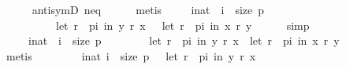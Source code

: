 \begin{isabellebody}
\ \ \ \ \isamarkupfalse%
\ antisymD\ neq\isanewline
\ \ \ \ \isamarkupfalse%
\ metis\isanewline
\ \ \isamarkupfalse%
\ {\isachardoublequoteopen}{\isasymforall}\ i{\isacharcolon}{\kern0pt}{\isacharcolon}{\kern0pt}nat\ {\isachardot}{\kern0pt}\ i\ {\isacharless}{\kern0pt}\ size\ p\ {\isasymlongrightarrow}\isanewline
\ \ \ \ \ \ \ \ \ \ {\isacharparenleft}{\kern0pt}{\isacharparenleft}{\kern0pt}let\ r\ {\isacharequal}{\kern0pt}\ {\isacharparenleft}{\kern0pt}p{\isacharbang}{\kern0pt}i{\isacharparenright}{\kern0pt}\ in\ {\isacharparenleft}{\kern0pt}y\ {\isasympreceq}\isactrlsub r\ x{\isacharparenright}{\kern0pt}{\isacharparenright}{\kern0pt}\ {\isasymlongrightarrow}\ {\isasymnot}\ {\isacharparenleft}{\kern0pt}let\ r\ {\isacharequal}{\kern0pt}\ {\isacharparenleft}{\kern0pt}p{\isacharbang}{\kern0pt}i{\isacharparenright}{\kern0pt}\ in\ {\isacharparenleft}{\kern0pt}x\ {\isasympreceq}\isactrlsub r\ y{\isacharparenright}{\kern0pt}{\isacharparenright}{\kern0pt}{\isacharparenright}{\kern0pt}{\isachardoublequoteclose}\isanewline
\ \ \ \ \isamarkupfalse%
\ simp\isanewline
\ \ \isamarkupfalse%
\ {}\ \isamarkupfalse%
\isanewline
\ \ \ \ {\isachardoublequoteopen}{\isasymforall}\ i{\isacharcolon}{\kern0pt}{\isacharcolon}{\kern0pt}nat\ {\isachardot}{\kern0pt}\ i\ {\isacharless}{\kern0pt}\ size\ p\ {\isasymlongrightarrow}\isanewline
\ \ \ \ \ \ {\isasymnot}\ {\isacharparenleft}{\kern0pt}let\ r\ {\isacharequal}{\kern0pt}\ {\isacharparenleft}{\kern0pt}p{\isacharbang}{\kern0pt}i{\isacharparenright}{\kern0pt}\ in\ {\isacharparenleft}{\kern0pt}y\ {\isasympreceq}\isactrlsub r\ x{\isacharparenright}{\kern0pt}{\isacharparenright}{\kern0pt}\ {\isacharequal}{\kern0pt}\ {\isacharparenleft}{\kern0pt}let\ r\ {\isacharequal}{\kern0pt}\ {\isacharparenleft}{\kern0pt}p{\isacharbang}{\kern0pt}i{\isacharparenright}{\kern0pt}\ in\ {\isacharparenleft}{\kern0pt}x\ {\isasympreceq}\isactrlsub r\ y{\isacharparenright}{\kern0pt}{\isacharparenright}{\kern0pt}{\isachardoublequoteclose}\isanewline
\ \ \ \ \isamarkupfalse%
\ metis\isanewline
\ \ \isamarkupfalse%
\ {}{\isacharcolon}{\kern0pt}\isanewline
\ \ \ \ {\isachardoublequoteopen}{\isacharbraceleft}{\kern0pt}i{\isacharcolon}{\kern0pt}{\isacharcolon}{\kern0pt}nat{\isachardot}{\kern0pt}\ i\ {\isacharless}{\kern0pt}\ size\ p\ {\isasymand}\ {\isasymnot}\ {\isacharparenleft}{\kern0pt}let\ r\ {\isacharequal}{\kern0pt}\ {\isacharparenleft}{\kern0pt}p{\isacharbang}{\kern0pt}i{\isacharparenright}{\kern0pt}\ in\ {\isacharparenleft}{\kern0pt}y\ {\isasympreceq}\isactrlsub r\ x{\isacharparenright}{\kern0pt}{\isacharparenright}{\kern0pt}{\isacharbraceright}{\kern0pt}\ {\isacharequal}{\kern0pt}\isanewline

\end{isabellebody}
